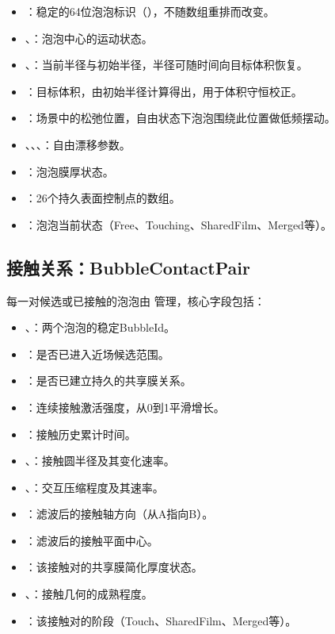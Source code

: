 \begin{itemize}
  \item {}：稳定的64位泡泡标识（），不随数组重排而改变。
  \item {}、：泡泡中心的运动状态。
  \item {}、：当前半径与初始半径，半径可随时间向目标体积恢复。
  \item {}：目标体积，由初始半径计算得出，用于体积守恒校正。
  \item {}：场景中的松弛位置，自由状态下泡泡围绕此位置做低频摆动。
  \item {}、、、：自由漂移参数。
  \item {}：泡泡膜厚状态。
  \item {}：26个持久表面控制点的数组。
  \item {}：泡泡当前状态（Free、Touching、SharedFilm、Merged等）。
\end{itemize}

\subsection{接触关系：BubbleContactPair}

每一对候选或已接触的泡泡由  管理，核心字段包括：

\begin{itemize}
  \item {}、：两个泡泡的稳定BubbleId。
  \item {}：是否已进入近场候选范围。
  \item {}：是否已建立持久的共享膜关系。
  \item {}：连续接触激活强度，从0到1平滑增长。
  \item {}：接触历史累计时间。
  \item {}、：接触圆半径及其变化速率。
  \item {}、：交互压缩程度及其速率。
  \item {}：滤波后的接触轴方向（从A指向B）。
  \item {}：滤波后的接触平面中心。
  \item {}：该接触对的共享膜简化厚度状态。
  \item {}、：接触几何的成熟程度。
  \item {}：该接触对的阶段（Touch、SharedFilm、Merged等）。
\end{itemize}

